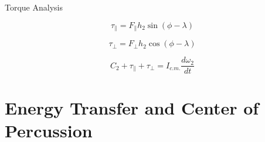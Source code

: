 \documentclass[tikz]{beamer}
\begin{document}
\begin{frame} {Torque Analysis}
	\only<3> {
		\begin{equation}
			\tau_{\parallel} = F_{\parallel} h_2 \sin{(\phi - \lambda)} \tag{12}
		\end{equation}

		\begin{equation}
			\tau_{\perp} = F_{\perp} h_2 \cos{(\phi - \lambda)} \tag{13}
		\end{equation}

		\begin{equation}
			C_2 + \tau_{\parallel} + \tau_{\perp} = I_{c.m.} \frac{d \omega_2}{dt} \tag{14}
		\end{equation}
	}
\end{frame}

\section{Energy Transfer and Center of Percussion}
\end{document}
